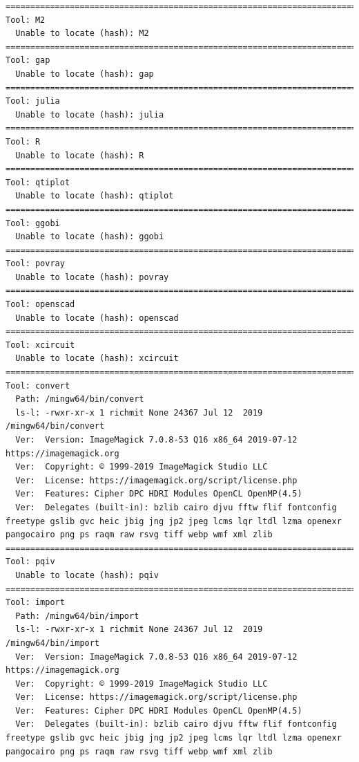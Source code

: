\documentclass[11pt]{article}
\begin{document}
\begin{verbatim}
==========================================================================================
Tool: M2
  Unable to locate (hash): M2
==========================================================================================
Tool: gap
  Unable to locate (hash): gap
==========================================================================================
Tool: julia
  Unable to locate (hash): julia
==========================================================================================
Tool: R
  Unable to locate (hash): R
==========================================================================================
Tool: qtiplot
  Unable to locate (hash): qtiplot
==========================================================================================
Tool: ggobi
  Unable to locate (hash): ggobi
==========================================================================================
Tool: povray
  Unable to locate (hash): povray
==========================================================================================
Tool: openscad
  Unable to locate (hash): openscad
==========================================================================================
Tool: xcircuit
  Unable to locate (hash): xcircuit
==========================================================================================
Tool: convert
  Path: /mingw64/bin/convert
  ls-l: -rwxr-xr-x 1 richmit None 24367 Jul 12  2019 /mingw64/bin/convert
  Ver:  Version: ImageMagick 7.0.8-53 Q16 x86_64 2019-07-12 https://imagemagick.org
  Ver:  Copyright: © 1999-2019 ImageMagick Studio LLC
  Ver:  License: https://imagemagick.org/script/license.php
  Ver:  Features: Cipher DPC HDRI Modules OpenCL OpenMP(4.5) 
  Ver:  Delegates (built-in): bzlib cairo djvu fftw flif fontconfig freetype gslib gvc heic jbig jng jp2 jpeg lcms lqr ltdl lzma openexr pangocairo png ps raqm raw rsvg tiff webp wmf xml zlib
==========================================================================================
Tool: pqiv
  Unable to locate (hash): pqiv
==========================================================================================
Tool: import
  Path: /mingw64/bin/import
  ls-l: -rwxr-xr-x 1 richmit None 24367 Jul 12  2019 /mingw64/bin/import
  Ver:  Version: ImageMagick 7.0.8-53 Q16 x86_64 2019-07-12 https://imagemagick.org
  Ver:  Copyright: © 1999-2019 ImageMagick Studio LLC
  Ver:  License: https://imagemagick.org/script/license.php
  Ver:  Features: Cipher DPC HDRI Modules OpenCL OpenMP(4.5) 
  Ver:  Delegates (built-in): bzlib cairo djvu fftw flif fontconfig freetype gslib gvc heic jbig jng jp2 jpeg lcms lqr ltdl lzma openexr pangocairo png ps raqm raw rsvg tiff webp wmf xml zlib

\end{verbatim}
\end{document}
